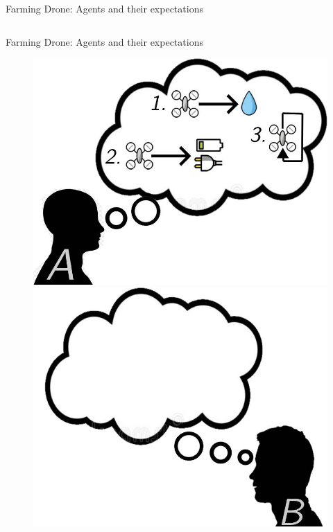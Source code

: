 \documentclass[usenames,dvipsnames]{beamer}
\begin{document}
\begin{frame}{Farming Drone: Agents and their expectations}
\begin{columns}
\begin{column}{.5\textwidth}
    \end{column}
    \end{columns}
\end{frame}


\begin{frame}{Farming Drone: Agents and their expectations}
    \begin{figure}
        \centering
        \includegraphics[scale=0.2]{images/a-expects-patrol.jpg}
        \includegraphics[scale=0.2]{images/b-expects.jpg}
    \end{figure}
     \begin{columns} 
    \begin{column}{.5\textwidth}

\end{column}
\end{columns}
\end{frame}
\end{document}
